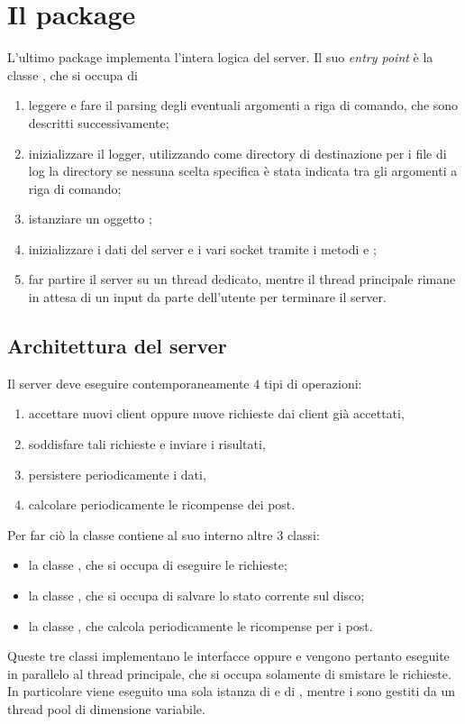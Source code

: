 \documentclass[
    oneside,
    10pt,
    language=italian,
    a4paper,
    article
]{notes}
\begin{document}
\section{Il package } \label{sec:server}
L'ultimo package implementa l'intera logica del server. Il suo \emph{entry point}
è la classe , che si occupa di
\begin{enumerate}[(1)]
    \item leggere e fare il parsing degli eventuali argomenti a riga di comando, 
        che sono descritti successivamente;
    \item inizializzare il logger, utilizzando come directory di destinazione per
        i file di log la directory  se nessuna scelta specifica è 
        stata indicata tra gli argomenti a riga di comando;
    \item istanziare un oggetto ;
    \item inizializzare i dati del server e i vari socket tramite i metodi
         e ;
    \item far partire il server su un thread dedicato, mentre il thread principale
        rimane in attesa di un input da parte dell'utente per terminare il server.
\end{enumerate}

\subsection{Architettura del server}
Il server deve eseguire contemporaneamente $4$ tipi di operazioni: 
\begin{enumerate}[(1)]
    \item accettare nuovi client oppure nuove richieste dai client già accettati,
    \item soddisfare tali richieste e inviare i risultati,
    \item persistere periodicamente i dati,
    \item calcolare periodicamente le ricompense dei post.
\end{enumerate}

Per far ciò la classe  contiene al suo interno altre $3$
classi: \begin{itemize}
    \item la classe , che si occupa di eseguire le richieste; 
    \item la classe , che si occupa di salvare lo stato
        corrente sul disco;
    \item la classe , che calcola periodicamente le
        ricompense per i post.
\end{itemize}
Queste tre classi implementano le interfacce  oppure
 e vengono pertanto eseguite in parallelo al thread
principale, che si occupa solamente di smistare le richieste. 
In particolare viene eseguito una sola istanza di  e di
, mentre i  sono gestiti da un thread pool
di dimensione variabile. 
\end{document}
